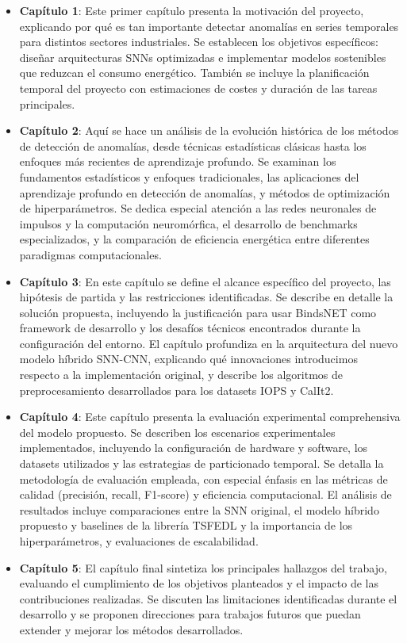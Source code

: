 \begin{itemize}
    \item\textbf{Capítulo 1}: Este primer capítulo presenta la motivación del proyecto, explicando por qué es tan importante detectar anomalías en series temporales para distintos sectores industriales. Se establecen los objetivos específicos: diseñar arquitecturas SNNs optimizadas e implementar modelos sostenibles que reduzcan el consumo energético. También se incluye la planificación temporal del proyecto con estimaciones de costes y duración de las tareas principales.
    
    \item\textbf{Capítulo 2}: Aquí se hace un análisis de la evolución histórica de los métodos de detección de anomalías, desde técnicas estadísticas clásicas hasta los enfoques más recientes de aprendizaje profundo. Se examinan los fundamentos estadísticos y enfoques tradicionales, las aplicaciones del aprendizaje profundo en detección de anomalías, y métodos de optimización de hiperparámetros. Se dedica especial atención a las redes neuronales de impulsos y la computación neuromórfica, el desarrollo de benchmarks especializados, y la comparación de eficiencia energética entre diferentes paradigmas computacionales.
    
    \item\textbf{Capítulo 3}: En este capítulo se define el alcance específico del proyecto, las hipótesis de partida y las restricciones identificadas. Se describe en detalle la solución propuesta, incluyendo la justificación para usar BindsNET como framework de desarrollo y los desafíos técnicos encontrados durante la configuración del entorno. El capítulo profundiza en la arquitectura del nuevo modelo híbrido SNN-CNN, explicando qué innovaciones introducimos respecto a la implementación original, y describe los algoritmos de preprocesamiento desarrollados para los datasets IOPS y CalIt2.
    
    \item\textbf{Capítulo 4}: Este capítulo presenta la evaluación experimental comprehensiva del modelo propuesto. Se describen los escenarios experimentales implementados, incluyendo la configuración de hardware y software, los datasets utilizados y las estrategias de particionado temporal. Se detalla la metodología de evaluación empleada, con especial énfasis en las métricas de calidad (precisión, recall, F1-score) y eficiencia computacional. El análisis de resultados incluye comparaciones entre la SNN original, el modelo híbrido propuesto y baselines de la librería TSFEDL y la importancia de los hiperparámetros, y evaluaciones de escalabilidad.
    
    \item\textbf{Capítulo 5}: El capítulo final sintetiza los principales hallazgos del trabajo, evaluando el cumplimiento de los objetivos planteados y el impacto de las contribuciones realizadas. Se discuten las limitaciones identificadas durante el desarrollo y se proponen direcciones para trabajos futuros que puedan extender y mejorar los métodos desarrollados.
\end{itemize}

